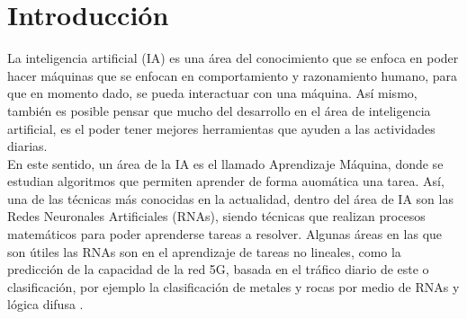 \chapter{Introducción}
  La inteligencia artificial (IA) es una área del conocimiento que se enfoca en poder hacer máquinas que se enfocan en comportamiento y razonamiento humano, para que en momento dado, se pueda interactuar con una máquina. Así mismo, también es posible pensar que mucho del desarrollo en el área de inteligencia artificial, es el poder tener mejores herramientas que ayuden a las actividades diarias.\\

  En este sentido, un área de la IA es el llamado Aprendizaje Máquina, donde se estudian algoritmos que permiten aprender de forma auomática una tarea.
  Así, una de las técnicas más conocidas en la actualidad, dentro del área de IA son las Redes Neuronales Artificiales (RNAs), siendo técnicas que realizan procesos matemáticos para poder aprenderse tareas a resolver. Algunas áreas en las que son útiles las RNAs son en el aprendizaje de tareas no lineales, como la predicción de la capacidad de la red 5G, basada en el tráfico diario de este \cite{zhao2022} o clasificación, por ejemplo la clasificación de metales y rocas por medio de RNAs y lógica difusa \cite{salazar2013}. \\






